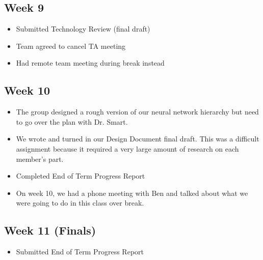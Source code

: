 \documentclass[draftclsnofoot, onecolumn, 10pt, compsoc]{IEEEtran}
\begin{document}
\subsection{Week 9}
  \begin{itemize}
      \item Submitted Technology Review (final draft) 
      \item Team agreed to cancel TA meeting
      \item Had remote team meeting during break instead
  \end{itemize}
  
\subsection{Week 10}
  \begin{itemize}
      \item The group designed a rough version of our neural network hierarchy but need to go over the plan with Dr. Smart.
      \item We wrote and turned in our Design Document final draft. This was a difficult assignment because it required a very large amount of research on each member's part. 
      \item Completed End of Term Progress Report
      \item On week 10, we had a phone meeting with Ben and talked about what we were going to do in this class over break.
  \end{itemize}
  
\subsection{Week 11 (Finals)}
  \begin{itemize}
      \item Submitted End of Term Progress Report
  \end{itemize}
  
\newpage
\end{document}
